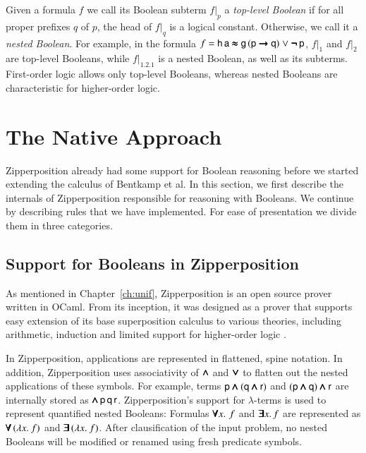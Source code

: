 Given a formula $f$ we call its Boolean subterm $f|_p$ a \emph{top-level
Boolean} if for all proper prefixes $q$ of $p$, the head of $f|_q$ is a logical
constant. Otherwise, we call it a \emph{nested Boolean}. For example, in the
formula $f = \mathsf{h} \, \mathsf{a} \pmb{\approx} \mathsf{g} \, (\mathsf{p} \pmb{\rightarrow} \mathsf{q})
\mathrel\lor \pmb{\neg\,}\mathsf{p}$, $f|_1$ and $f|_2$ are top-level Booleans, while
$f|_{1.2.1}$ is a nested Boolean, as well as its subterms. First-order logic
allows only top-level Booleans, whereas nested Booleans are characteristic for
higher-order logic. 

\section{The Native Approach} 
\label{sect:bool:native}

Zipperposition already had some support for Boolean reasoning before we
started extending the calculus of Bentkamp et al. In this section, we first
describe the internals of Zipperposition responsible for reasoning with
Booleans. We continue by describing  rules that we have
implemented. For ease of presentation we divide them in three categories.
\subsection{Support for Booleans in Zipperposition}
\label{subsect:bool:zip-bools}

As mentioned in Chapter~\ref{ch:unif}, Zipperposition is an open source prover
written in OCaml. From its inception, it was designed as a prover that supports
easy extension of its base superposition calculus to various theories, including
arithmetic, induction and limited support for higher-order logic
\cite{sc-15-simon-phd}.

In Zipperposition, applications are represented in flattened, spine notation. In
addition, Zipperposition uses associativity of $\pmb{\land}$ and $\pmb{\lor}$ to flatten out
the nested applications of these symbols. For example, terms $\mathsf{p} \pmb{\land}
(\mathsf{q} \pmb{\land} \mathsf{r})$ and $(\mathsf{p} \pmb{\land} \mathsf{q}) \pmb{\land} \mathsf{r}$ are
internally stored as $\pmb{\land} \, \mathsf{p} \, \mathsf{q} \, \mathsf{r}$. 
Zipperposition's support for $\lambda$-terms is used to represent quantified nested
Booleans: Formulas $\pmb{\forall} x. \, \, f$ and $\pmb{\exists} x. \, f$ are represented as
$\pmb{\forall} \, (\lambda x.\> f)$ and $\pmb{\exists} \, (\lambda x.\> f)$. After clausification of the
input problem, no nested Booleans will be modified or renamed using fresh
predicate symbols.

